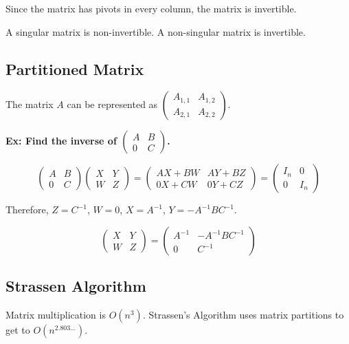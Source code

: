 \noindent
Since the matrix has pivots in every column, the matrix is invertible.

\begin{definition}
    A singular matrix is non-invertible. A non-singular matrix is invertible.
\end{definition}

\subsection{Partitioned Matrix}
The matrix \(A\) can be represented as \(\begin{pmatrix}
    A_{1,1} & A _{1,2} \\
    A_{2,1} & A_{2,2}
\end{pmatrix}\).

\noindent
\newline
\textbf{Ex: Find the inverse of \(\begin{pmatrix}
    A & B \\
    0 & C
\end{pmatrix}\).}

\begin{equation}
    \begin{pmatrix}
        A & B \\
        0 & C
    \end{pmatrix}
    \begin{pmatrix}
        X & Y \\
        W & Z
    \end{pmatrix} =
    \begin{pmatrix}
        AX + BW & AY + BZ \\
        0X + CW & 0Y + CZ
    \end{pmatrix} =
    \begin{pmatrix}
        I_n & 0 \\
        0 & I_n
    \end{pmatrix}
\end{equation}

\noindent
Therefore, \(Z = C^{-1}\), \(W = 0\), \(X = A^{-1}\), \(Y=-A^{-1}BC^{-1}\).

\begin{equation}
    \begin{pmatrix}
        X & Y \\
        W & Z
    \end{pmatrix} = \begin{pmatrix}
        A^{-1} & -A^{-1}BC^{-1} \\
        0 & C^{-1}
    \end{pmatrix}
\end{equation}

\subsection{Strassen Algorithm}
Matrix multiplication is \(O(n^3)\). Strassen's Algorithm uses matrix partitions to get to \(O(n^{2.803\dots})\).